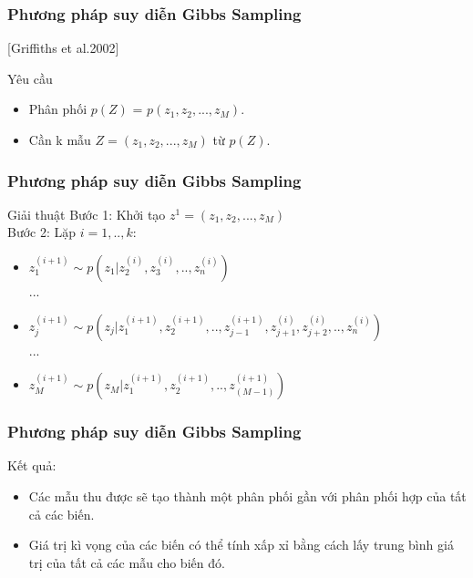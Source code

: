 \documentclass{beamer}
\begin{document}
\begin{frame}
\frametitle{Phương pháp suy diễn Gibbs Sampling}
[Griffiths et al.2002]
\begin{block}{Yêu cầu}
\begin{itemize}
\item Phân phối $p(Z)$ = $p(z_1, z_2,...,z_M)$. \\
\item Cần k mẫu $Z = (z_1, z_2,...,z_M)$ từ $p(Z)$. \\
\end{itemize}
\end{block}
\end{frame}

\begin{frame}
\frametitle{Phương pháp suy diễn Gibbs Sampling}
\begin{block}{Giải thuật}
Bước 1: Khởi tạo $z^1 = (z_1, z_2,...,z_M)$\\
Bước 2: Lặp $i = 1,..,k$:
\begin{itemize}
\item $z_1^{(i+1)} \sim p(z_1|z_2^{(i)}, z_3^{(i)},..,z_n^{(i)})$
\\...
\item $z_j^{(i+1)} \sim p(z_j|z_1^{(i+1)}, z_2^{(i+1)},..,z_{j-1}^{(i+1)}, z_{j+1}^{(i)}, z_{j+2}^{(i)},.., z_n^{(i)})$
\\...
\item $z_M^{(i+1)} \sim p(z_M|z_1^{(i+1)}, z_2^{(i+1)},..,z_{(M-1)}^{(i+1)})$
\end{itemize}
\end{block}
\end{frame}

\begin{frame}
\frametitle{Phương pháp suy diễn Gibbs Sampling}
Kết quả:
\begin{itemize}
\item Các mẫu thu được sẽ tạo thành một phân phối gần với phân phối hợp của tất cả các biến.
\item Giá trị kì vọng của các biến có thể tính xấp xỉ bằng cách lấy trung bình giá trị của tất cả các mẫu cho biến đó.
\end{itemize}
\end{frame}
\end{document}
